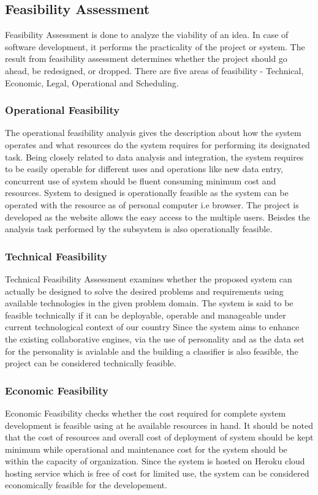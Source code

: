 \subsection{Feasibility Assessment}
Feasibility Assessment is done to analyze the viability of an idea. In case of software development, it performs the practicality of the project or system. The result from feasibility assessment determines whether the project should go ahead, be redesigned, or dropped. There are
five areas of feasibility - Technical, Economic, Legal, Operational and Scheduling.

\subsubsection{Operational Feasibility}

The operational feasibility analysis gives the description about how the system operates and what resources do the system requires for performing its designated task. Being closely related to data analysis and integration, the system requires to be easily operable for different uses and operations like new data entry, concurrent use of system should be fluent consuming minimum cost and resources.
System to designed is operationally feasible as the system can be operated with the resource as of personal computer i.e browser. The project is developed as the website allows the easy access to the multiple  users. Beisdes the analysis task performed by the subsystem is also operationally feasible.

\subsubsection{Technical Feasibility}
Technical Feasibility Assessment examines whether the proposed system can actually be designed to solve the desired problems and requirements using available technologies in the given problem domain. The system is said to be feasible technically if it can be deployable, operable and manageable under current technological context of our country
Since the system aims to enhance the existing collaborative engines, via the use of personality and as the data set for the personality is avialable and the building a classifier is also feasible, the project can be considered technically feasible.

\subsubsection{Economic Feasibility}
Economic Feasibility checks whether the cost required for complete system development is feasible using at he available resources in hand. It should be noted that the cost of resources and overall cost of deployment of system should be kept minimum while operational and maintenance cost for the system should be within the capacity of organization.
Since the system is hosted on Heroku cloud hosting service which is free of cost for limited use, the system can be considered economically feasible for the developement.

